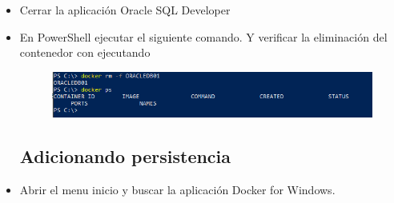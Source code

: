 \begin{itemize}
	\item Cerrar la aplicación Oracle SQL Developer
	\item En PowerShell ejecutar el siguiente comando. Y verificar la eliminación del contenedor con ejecutando
		\begin{figure}[H]
		\begin{center}
		\includegraphics[width=12cm]{./Imagenes/15}
		\end{center}
		\end{figure}


\subsection{Adicionando persistencia}
	\item Abrir el menu inicio y buscar la aplicación Docker for Windows.
       
\end{itemize}
		